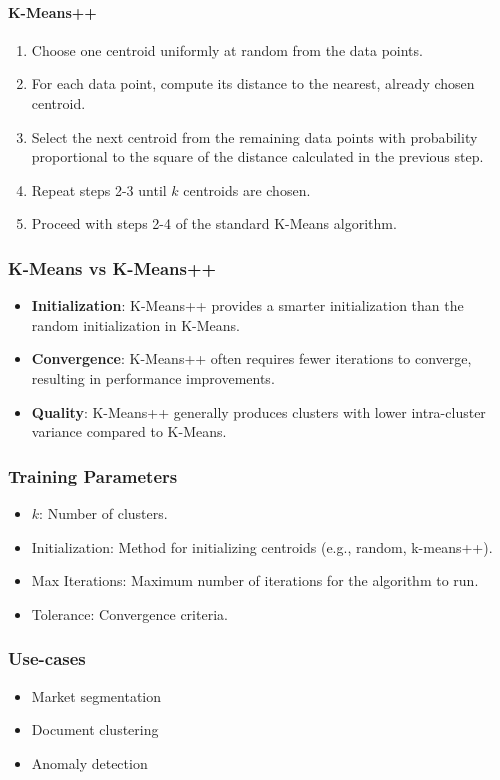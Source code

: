 \documentclass[english, threecolumn]{latex4ei/latex4ei_sheet}
\begin{document}
\begin{sectionbox}
\paragraph{K-Means++}
\begin{enumerate}
    \item Choose one centroid uniformly at random from the data points.
    \item For each data point, compute its distance to the nearest, already chosen centroid.
    \item Select the next centroid from the remaining data points with probability proportional to the square of the distance calculated in the previous step.
    \item Repeat steps 2-3 until \( k \) centroids are chosen.
    \item Proceed with steps 2-4 of the standard K-Means algorithm.
\end{enumerate}

\subsubsection{K-Means vs K-Means++}
\begin{itemize}
    \item \textbf{Initialization}: K-Means++ provides a smarter initialization than the random initialization in K-Means.
    \item \textbf{Convergence}: K-Means++ often requires fewer iterations to converge, resulting in performance improvements.
    \item \textbf{Quality}: K-Means++ generally produces clusters with lower intra-cluster variance compared to K-Means.
\end{itemize}

\subsubsection{Training Parameters}
\begin{itemize}
    \item \( k \): Number of clusters.
    \item Initialization: Method for initializing centroids (e.g., random, k-means++).
    \item Max Iterations: Maximum number of iterations for the algorithm to run.
    \item Tolerance: Convergence criteria.
\end{itemize}

\subsubsection{Use-cases}
\begin{itemize}
    \item Market segmentation
    \item Document clustering
    \item Anomaly detection
\end{itemize}


\end{sectionbox}
\end{document}
